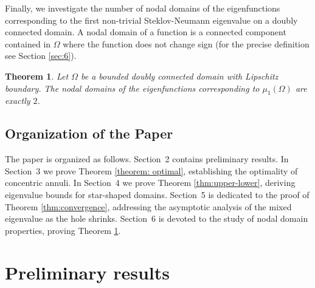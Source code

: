 \documentclass[12pt,reqno]{amsart}
\newtheorem{theorem}{Theorem}[section]
\numberwithin{equation}{section}
\numberwithin{theorem}{section}
\numberwithin{equation}{section}
\numberwithin{theorem}{section}
\begin{document}
Finally, we investigate the number of nodal domains of the eigenfunctions corresponding to the first non-trivial Steklov-Neumann eigenvalue on a doubly connected domain. A nodal domain of a function is a connected component contained in $\Omega$ where the function does not change sign (for the precise definition see Section \ref{sec:6}).
 

\begin{theorem}
\label{prop:nodaldomains}
    Let $\Omega$ be a bounded doubly connected domain with Lipschitz boundary. The nodal domains of the eigenfunctions corresponding to $\mu_1(\Omega)$ are exactly $2$.
    
\end{theorem}

\subsection{Organization of the Paper}

The paper is organized as follows. Section~2 contains preliminary results. In Section~3 we prove Theorem \ref{theorem: optimal},  establishing the optimality of concentric annuli.
In Section~4 we prove Theorem \ref{thm:upper-lower}, deriving eigenvalue bounds for star-shaped domains. Section~5 is dedicated to the proof of Theorem \ref{thm:convergence}, addressing 
 the asymptotic analysis of the mixed eigenvalue as the hole shrinks. Section~6 is devoted to the study of nodal domain
properties, proving Theorem \ref{prop:nodaldomains}. 





\section{Preliminary results}
\end{document}

